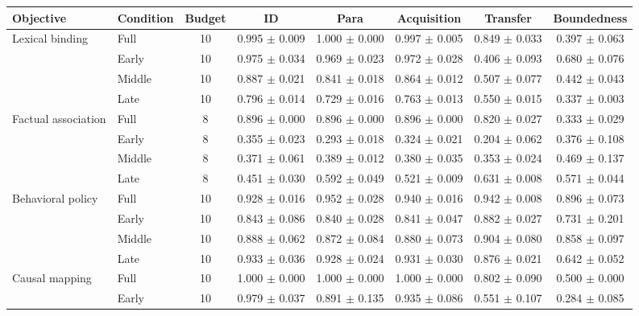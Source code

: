 \begin{table}[t]
\centering
\scriptsize
\setlength{\tabcolsep}{4pt}
\begin{tabular}{llcccccc}
\toprule
Objective & Condition & Budget & ID & Para & Acquisition & Transfer & Boundedness \\
\midrule
Lexical binding & Full & 10 & 0.995 $\pm$ 0.009 & 1.000 $\pm$ 0.000 & 0.997 $\pm$ 0.005 & 0.849 $\pm$ 0.033 & 0.397 $\pm$ 0.063 \\
 & Early & 10 & 0.975 $\pm$ 0.034 & 0.969 $\pm$ 0.023 & 0.972 $\pm$ 0.028 & 0.406 $\pm$ 0.093 & 0.680 $\pm$ 0.076 \\
 & Middle & 10 & 0.887 $\pm$ 0.021 & 0.841 $\pm$ 0.018 & 0.864 $\pm$ 0.012 & 0.507 $\pm$ 0.077 & 0.442 $\pm$ 0.043 \\
 & Late & 10 & 0.796 $\pm$ 0.014 & 0.729 $\pm$ 0.016 & 0.763 $\pm$ 0.013 & 0.550 $\pm$ 0.015 & 0.337 $\pm$ 0.003 \\
\addlinespace[0.35em]
Factual association & Full & 8 & 0.896 $\pm$ 0.000 & 0.896 $\pm$ 0.000 & 0.896 $\pm$ 0.000 & 0.820 $\pm$ 0.027 & 0.333 $\pm$ 0.029 \\
 & Early & 8 & 0.355 $\pm$ 0.023 & 0.293 $\pm$ 0.018 & 0.324 $\pm$ 0.021 & 0.204 $\pm$ 0.062 & 0.376 $\pm$ 0.108 \\
 & Middle & 8 & 0.371 $\pm$ 0.061 & 0.389 $\pm$ 0.012 & 0.380 $\pm$ 0.035 & 0.353 $\pm$ 0.024 & 0.469 $\pm$ 0.137 \\
 & Late & 8 & 0.451 $\pm$ 0.030 & 0.592 $\pm$ 0.049 & 0.521 $\pm$ 0.009 & 0.631 $\pm$ 0.008 & 0.571 $\pm$ 0.044 \\
\addlinespace[0.35em]
Behavioral policy & Full & 10 & 0.928 $\pm$ 0.016 & 0.952 $\pm$ 0.028 & 0.940 $\pm$ 0.016 & 0.942 $\pm$ 0.008 & 0.896 $\pm$ 0.073 \\
 & Early & 10 & 0.843 $\pm$ 0.086 & 0.840 $\pm$ 0.028 & 0.841 $\pm$ 0.047 & 0.882 $\pm$ 0.027 & 0.731 $\pm$ 0.201 \\
 & Middle & 10 & 0.888 $\pm$ 0.062 & 0.872 $\pm$ 0.084 & 0.880 $\pm$ 0.073 & 0.904 $\pm$ 0.080 & 0.858 $\pm$ 0.097 \\
 & Late & 10 & 0.933 $\pm$ 0.036 & 0.928 $\pm$ 0.024 & 0.931 $\pm$ 0.030 & 0.876 $\pm$ 0.021 & 0.642 $\pm$ 0.052 \\
\addlinespace[0.35em]
Causal mapping & Full & 10 & 1.000 $\pm$ 0.000 & 1.000 $\pm$ 0.000 & 1.000 $\pm$ 0.000 & 0.802 $\pm$ 0.090 & 0.500 $\pm$ 0.000 \\
 & Early & 10 & 0.979 $\pm$ 0.037 & 0.891 $\pm$ 0.135 & 0.935 $\pm$ 0.086 & 0.551 $\pm$ 0.107 & 0.284 $\pm$ 0.085 \\

\end{tabular}
\end{table}
